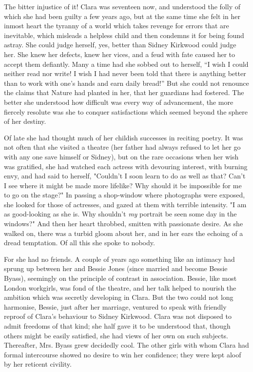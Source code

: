 The bitter injustice of it! Clara was seventeen now, and understood the
folly of which she had been guilty a few years ago, but at the same time
she felt in her inmost heart the tyranny of a world which takes revenge
for errors that are inevitable, which misleads a
{\protect\hypertarget{198}{}{}}helpless child and then condemns it for
being found astray. She could judge herself, yes, better than Sidney
Kirkwood could judge her. She knew her defects, knew her vices, and a
feud with fate caused her to accept them defiantly. Many a time had she
sobbed out to herself, ``I wish I could neither read nor write! I wish I
had never been told that there is anything better than to work with
one's hands and earn daily bread!'' But she could not renounce the
claims that Nature had planted in her, that her guardians had fostered.
The better she understood how difficult was every way of advancement,
the more fiercely resolute was she to conquer satisfactions which seemed
beyond the sphere of her destiny.

Of late she had thought much of her childish successes in reciting
poetry. It was not often that she visited a theatre (her father had
always refused to let her go with any one save himself or Sidney), but
on the rare occasions when her wish was gratified, she had watched each
actress with devouring interest, with burning envy, and had said to
herself, "Couldn't {\protect\hypertarget{199}{}{}}I soon learn to do as
well as that? Can't I see where it might be made more lifelike? Why
should it be impossible for me to go on the stage?" In passing a
shop-window where photographs were exposed, she looked for those of
actresses, and gazed at them with terrible intensity. "I am as
good-looking as she is. Why shouldn't \emph{my} portrait be seen some
day in the windows?" And then her heart throbbed, smitten with
passionate desire. As she walked on, there was a turbid gloom about her,
and in her ears the echoing of a dread temptation. Of all this she spoke
to nobody.

For she had no friends. A couple of years ago something like an intimacy
had sprung up between her and Bessie Jones (since married and become
Bessie Byass), seemingly on the principle of contrast in association.
Bessie, like most London workgirls, was fond of the theatre, and her
talk helped to nourish the ambition which was secretly developing in
Clara. But the two could not long harmonise, Bessie, just after her
marriage, ventured to speak with friendly reproof of Clara's
{\protect\hypertarget{200}{}{}}behaviour to Sidney Kirkwood. Clara was
not disposed to admit freedoms of that kind; she half gave it to be
understood that, though others might be easily satisfied, she had views
of her own on such subjects. Thereafter, Mrs. Byass grew decidedly cool.
The other girls with whom Clara had formal intercourse showed no desire
to win her confidence; they were kept aloof by her reticent civility.

